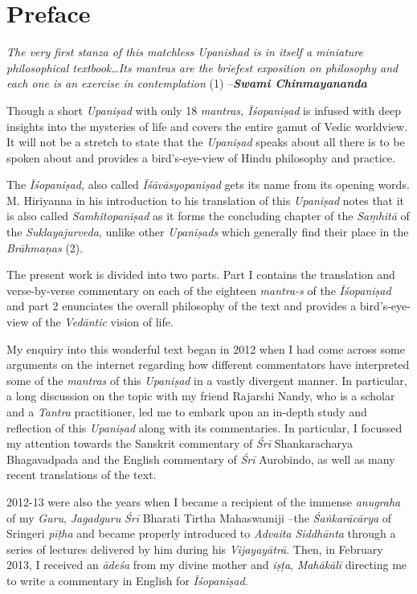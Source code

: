 \chapter{Preface}

\begin{center}
\emph{The very first stanza of this matchless Upanishad is in itself a miniature philosophical textbook\ldots{}Its mantras are the briefest exposition on philosophy and each one is an exercise in contemplation} (1) --\emph{\textbf{Swami Chinmayananda}}
\end{center}

Though a short \emph{Upaniṣad} with only 18 \emph{mantras, Īśopaniṣad} is infused with deep insights into the mysteries of life and covers the entire gamut of Vedic worldview. It will not be a stretch to state that the \emph{Upaniṣad} speaks about all there is to be spoken about and provides a bird's-eye-view of Hindu philosophy and practice.

The \emph{Īśopaniṣad,} also called \emph{Īśāvāsyopaniṣad} gets its name from its opening words. M. Hiriyanna in his introduction to his translation of this \emph{Upaniṣad} notes that it is also called \emph{Samhitopaniṣad} as it forms the concluding chapter of the \emph{Saṃhitā} of the \emph{Suklayajurveda}, unlike other \emph{Upaniṣads} which generally find their place in the \emph{Brāhmaṇas} (2).

The present work is divided into two parts. Part I contains the translation and verse-by-verse commentary on each of the eighteen \emph{mantra-s} of the \emph{Īśopaniṣad} and part 2 enunciates the overall philosophy of the text and provides a bird's-eye-view of the \emph{Vedāntic} vision of life.

My enquiry into this wonderful text began in 2012 when I had come across some arguments on the internet regarding how different commentators have interpreted some of the \emph{mantras} of this \emph{Upaniṣad} in a vastly divergent manner. In particular, a long discussion on the topic with my friend Rajarshi Nandy, who is a scholar and a \emph{Tantra} practitioner, led me to embark upon an in-depth study and reflection of this \emph{Upaniṣad} along with its commentaries. In particular, I focussed my attention towards the Sanskrit commentary of \emph{Śrī} Shankaracharya Bhagavadpada and the English commentary of \emph{Śrī} Aurobindo, as well as many recent translations of the text.

2012-13 were also the years when I became a recipient of the immense \emph{anugraha} of my \emph{Guru}, \emph{Jagadguru} \emph{Śrī} Bharati Tirtha Mahaswamiji --the \emph{Śaṅkarācārya} of Sringeri \emph{pīṭha} and became properly introduced to \emph{Advaita Siddhānta} through a series of lectures delivered by him during his \emph{Vijayayātrā}. Then, in February 2013, I received an \emph{ādeśa} from my divine mother and \emph{iṣṭa}, \emph{Mahākālī} directing me to write a commentary in English for \emph{Īśopaniṣad}.

